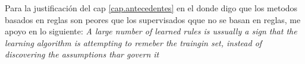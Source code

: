 Para la justificación del cap \ref{cap.antecedentes} en el donde digo que los metodos basados en reglas son peores que los supervisados qque no se basan en reglas, me apoyo en lo siguiente: \textit{A large number of learned rules is ussually a sign that the learning algorithm is attempting to remeber the traingin set, instead of discovering the assumptions thar govern it} \cite{kotsiantis2007supervised}